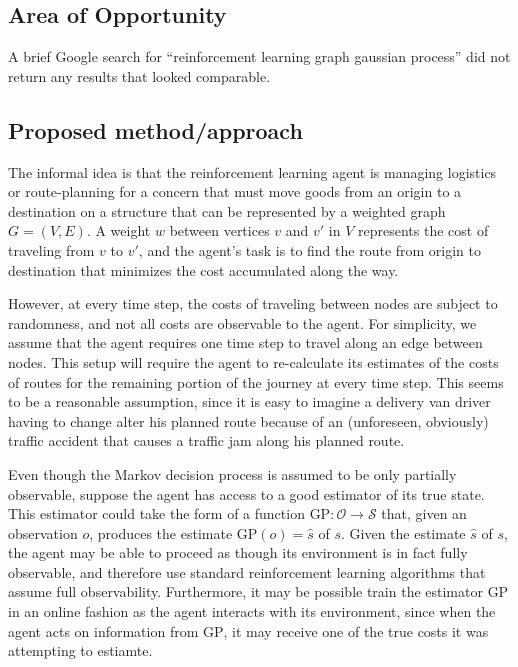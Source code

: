 \subsection{Area of Opportunity}

A brief Google search for ``reinforcement learning graph gaussian process'' did not return any results that looked comparable.

\subsection{Proposed method/approach}

The informal idea is that the reinforcement learning agent is managing logistics or route-planning for a concern that must move goods from an origin to a destination on a structure that can be represented by a weighted graph $G = (V, E)$. A weight $w$ between vertices $v$ and $v'$ in $V$ represents the cost of traveling from $v$ to $v'$, and the agent's task is to find the route from origin to destination that minimizes the cost accumulated along the way.

However, at every time step, the costs of traveling between nodes are subject to randomness, and not all costs are observable to the agent. For simplicity, we assume that the agent requires one time step to travel along an edge between nodes. This setup will require the agent to re-calculate its estimates of the costs of routes for the remaining portion of the journey at every time step. This seems to be a reasonable assumption, since it is easy to imagine a delivery van driver having to change alter his planned route because of an (unforeseen, obviously) traffic accident that causes a traffic jam along his planned route.

Even though the Markov decision process is assumed to be only partially observable, suppose the agent has access to a good estimator of its true state. This estimator could take the form of a function $\text{GP} \colon \mathcal O \to \mathcal S$ that, given an observation $o$, produces the estimate $\text{GP}(o) = \hat s$ of $s$. Given the estimate $\hat s$ of $s$, the agent may be able to proceed as though its environment is in fact fully observable, and therefore use standard reinforcement learning algorithms that assume full observability. Furthermore, it may be possible train the estimator $\text{GP}$ in an online fashion as the agent interacts with its environment, since when the agent acts on information from $\text{GP}$, it may receive one of the true costs it was attempting to estiamte.

